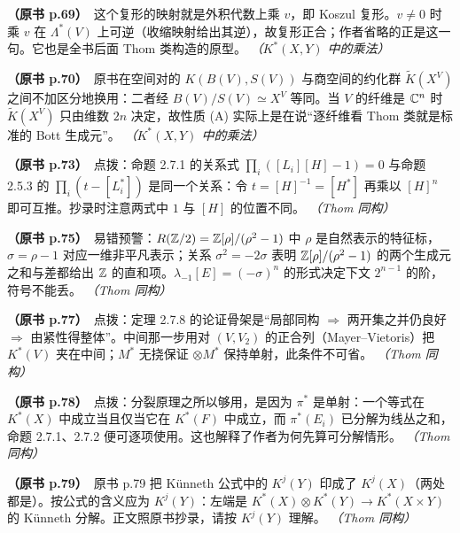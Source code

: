 \noindent \textbf{（原书 p.69）}\ 这个复形的映射就是外积代数上乘 $v$，即 Koszul 复形。$v\ne0$ 时乘 $v$ 在 $\Lambda^*(V)$ 上可逆（收缩映射给出其逆），故复形正合；作者省略的正是这一句。它也是全书后面 Thom 类构造的原型。 \textit{（$K^*(X,Y)$ 中的乘法）}\par\smallskip

\noindent \textbf{（原书 p.70）}\ 原书在空间对的 $K(B(V),S(V))$ 与商空间的约化群 $\tilde K(X^V)$ 之间不加区分地换用：二者经 $B(V)/S(V)\simeq X^V$ 等同。当 $V$ 的纤维是 $\mathbb{C}^n$ 时 $\tilde K(X^V)$ 只由维数 $2n$ 决定，故性质 (A) 实际上是在说“逐纤维看 Thom 类就是标准的 Bott 生成元”。 \textit{（$K^*(X,Y)$ 中的乘法）}\par\smallskip

\noindent \textbf{（原书 p.73）}\ 点拨：命题 2.7.1 的关系式 $\prod_i([L_i][H]-1)=0$ 与命题 2.5.3 的 $\prod_i(t-[L_i^*])$ 是同一个关系：令 $t=[H]^{-1}=[H^*]$ 再乘以 $[H]^n$ 即可互推。抄录时注意两式中 $1$ 与 $[H]$ 的位置不同。 \textit{（Thom 同构）}\par\smallskip

\noindent \textbf{（原书 p.75）}\ 易错预警：$R(\mathbb{Z}/2)=\mathbb{Z}[\rho]/(\rho^2-1)$ 中 $\rho$ 是自然表示的特征标，$\sigma=\rho-1$ 对应一维非平凡表示；关系 $\sigma^2=-2\sigma$ 表明 $\mathbb{Z}[\rho]/(\rho^2-1)$ 的两个生成元之和与差都给出 $\mathbb{Z}$ 的直和项。$\lambda_{-1}[E]=(-\sigma)^n$ 的形式决定下文 $2^{n-1}$ 的阶，符号不能丢。 \textit{（Thom 同构）}\par\smallskip

\noindent \textbf{（原书 p.77）}\ 点拨：定理 2.7.8 的论证骨架是“局部同构 $\Rightarrow$ 两开集之并仍良好 $\Rightarrow$ 由紧性得整体”。中间那一步用对 $(V,V_2)$ 的正合列（Mayer–Vietoris）把 $K^*(V)$ 夹在中间；$M^*$ 无挠保证 $\otimes M^*$ 保持单射，此条件不可省。 \textit{（Thom 同构）}\par\smallskip

\noindent \textbf{（原书 p.78）}\ 点拨：分裂原理之所以够用，是因为 $\pi^*$ 是单射：一个等式在 $K^*(X)$ 中成立当且仅当它在 $K^*(F)$ 中成立，而 $\pi^*(E_i)$ 已分解为线丛之和，命题 2.7.1、2.7.2 便可逐项使用。这也解释了作者为何先算可分解情形。 \textit{（Thom 同构）}\par\smallskip

\noindent \textbf{（原书 p.79）}\ 原书 p.79 把 Künneth 公式中的 $K^j(Y)$ 印成了 $K^j(X)$（两处都是）。按公式的含义应为 $K^j(Y)$：左端是 $K^*(X)\otimes K^*(Y)\to K^*(X\times Y)$ 的 Künneth 分解。正文照原书抄录，请按 $K^j(Y)$ 理解。 \textit{（Thom 同构）}\par\smallskip

